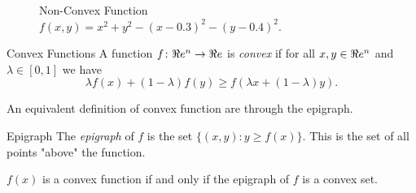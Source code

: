 \begin{figure}[H]
\begin{center}
\end{center}
    \caption{Non-Convex Function $f(x,y) = x^2 + y^2 - (x - 0.3)^2 - (y - 0.4)^2$.}
\end{figure} 



\begin{definition}{Convex Functions}{}
A function $f \colon \Re e^n \to \Re e$ is \emph{convex} if for all $x,y \in \Re e^n$ and $\lambda \in [0,1]$ we have 
\begin{equation}
\lambda f(x) + (1-\lambda)f(y) \geq f(\lambda x + (1-\lambda) y).
\end{equation}
\end{definition}



\begin{figure}[H]


\end{figure}



An equivalent definition of convex function are through the epigraph.

\begin{definition}{Epigraph}{}
The \emph{epigraph} of $f$ is the set $\{(x,y) : y \geq f(x)\}$.  This is the set of all points "above" the function.
\end{definition}

\begin{theorem}{}{}
$f(x)$ is a convex function if and only if the epigraph of $f$ is a convex set.
\end{theorem}

